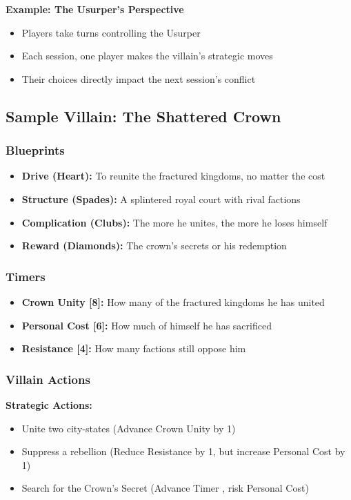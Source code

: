 \documentclass[10pt]{article}
\begin{document}
\textbf{Example: The Usurper's Perspective}
\begin{itemize}
  \item Players take turns controlling the Usurper
  \item Each session, one player makes the villain's strategic moves
  \item Their choices directly impact the next session's conflict
\end{itemize}

\subsection{Sample Villain: The Shattered Crown}

\subsubsection{Blueprints}

\begin{itemize}
  \item \textbf{Drive (Heart):} To reunite the fractured kingdoms, no matter the cost
  \item \textbf{Structure (Spades):} A splintered royal court with rival factions
  \item \textbf{Complication (Clubs):} The more he unites, the more he loses himself
  \item \textbf{Reward (Diamonds):} The crown's secrets or his redemption
\end{itemize}

\subsubsection{Timers}

\begin{itemize}
  \item \textbf{Crown Unity [8]:} How many of the fractured kingdoms he has united
  \item \textbf{Personal Cost [6]:} How much of himself he has sacrificed
  \item \textbf{Resistance [4]:} How many factions still oppose him
\end{itemize}

\subsubsection{Villain Actions}

\textbf{Strategic Actions:}
\begin{itemize}
  \item Unite two city-states (Advance Crown Unity by 1)
  \item Suppress a rebellion (Reduce Resistance by 1, but increase Personal Cost by 1)
  \item Search for the Crown's Secret (Advance Timer , risk Personal Cost)
\end{itemize}
\end{document}
